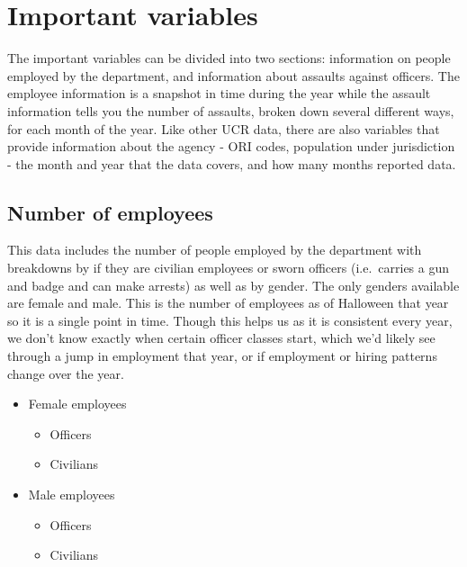 \documentclass[
  12pt,
  openany]{book}
\providecommand{\tightlist}{%
  \setlength{\itemsep}{0pt}\setlength{\parskip}{0pt}}
\begin{document}
\section{Important variables}\label{important-variables-4}

The important variables can be divided into two sections: information on people employed by the department, and information about assaults against officers. The employee information is a snapshot in time during the year while the assault information tells you the number of assaults, broken down several different ways, for each month of the year. Like other UCR data, there are also variables that provide information about the agency - ORI codes, population under jurisdiction - the month and year that the data covers, and how many months reported data.

\subsection{Number of employees}\label{number-of-employees}

This data includes the number of people employed by the department with breakdowns by if they are civilian employees or sworn officers (i.e.~carries a gun and badge and can make arrests) as well as by gender. The only genders available are female and male. This is the number of employees as of Halloween that year so it is a single point in time. Though this helps us as it is consistent every year, we don't know exactly when certain officer classes start, which we'd likely see through a jump in employment that year, or if employment or hiring patterns change over the year.

\begin{itemize}
\tightlist
\item
  Female employees

  \begin{itemize}
  \tightlist
  \item
    Officers
  \item
    Civilians
  \end{itemize}
\item
  Male employees

  \begin{itemize}
  \tightlist
  \item
    Officers
  \item
    Civilians
  \end{itemize}
\end{itemize}
\end{document}
